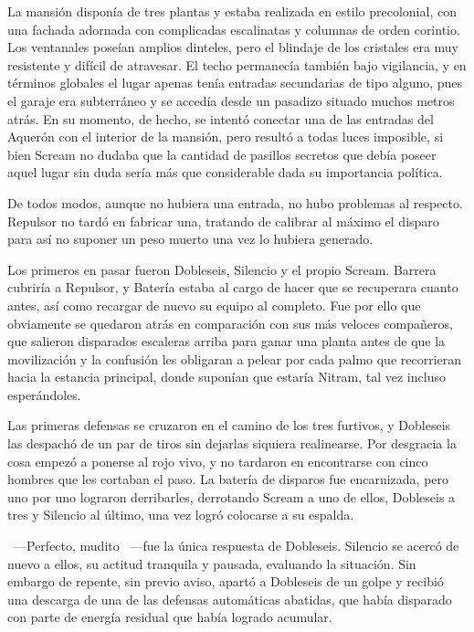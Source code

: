 La mansión disponía de tres plantas y estaba realizada en estilo precolonial, con una fachada adornada con complicadas escalinatas y columnas de orden corintio. Los ventanales poseían amplios dinteles, pero el blindaje de los cristales era muy resistente y difícil de atravesar. El techo permanecía también bajo vigilancia, y en términos globales el lugar apenas tenía entradas secundarias de tipo alguno, pues el garaje era subterráneo y se accedía desde un pasadizo situado muchos metros atrás. En su momento, de hecho, se intentó conectar una de las entradas del Aquerón con el interior de la mansión, pero resultó a todas luces imposible, si bien Scream no dudaba que la cantidad de pasillos secretos que debía poseer aquel lugar sin duda sería más que considerable dada su importancia política.

De todos modos, aunque no hubiera una entrada, no hubo problemas al respecto. Repulsor no tardó en fabricar una, tratando de calibrar al máximo el disparo para así no suponer un peso muerto una vez lo hubiera generado.

Los primeros en pasar fueron Dobleseis, Silencio y el propio Scream. Barrera cubriría a Repulsor, y Batería estaba al cargo de hacer que se recuperara cuanto antes, así como recargar de nuevo su equipo al completo. Fue por ello que obviamente se quedaron atrás en comparación con sus más veloces compañeros, que salieron disparados escaleras arriba para ganar una planta antes de que la movilización y la confusión les obligaran a pelear por cada palmo que recorrieran hacia la estancia principal, donde suponían que estaría Nitram, tal vez incluso esperándoles.

Las primeras defensas se cruzaron en el camino de los tres furtivos, y Dobleseis las despachó de un par de tiros sin dejarlas siquiera realinearse. Por desgracia la cosa empezó a ponerse al rojo vivo, y no tardaron en encontrarse con cinco hombres que les cortaban el paso. La batería de disparos fue encarnizada, pero uno por uno lograron derribarles, derrotando Scream a uno de ellos, Dobleseis a tres y Silencio al último, una vez logró colocarse a su espalda.

~---Perfecto, mudito ~---fue la única respuesta de Dobleseis. Silencio se acercó de nuevo a ellos, su actitud tranquila y pausada, evaluando la situación. Sin embargo de repente, sin previo aviso, apartó a Dobleseis de un golpe y recibió una descarga de una de las defensas automáticas abatidas, que había disparado con parte de energía residual que había logrado acumular.


